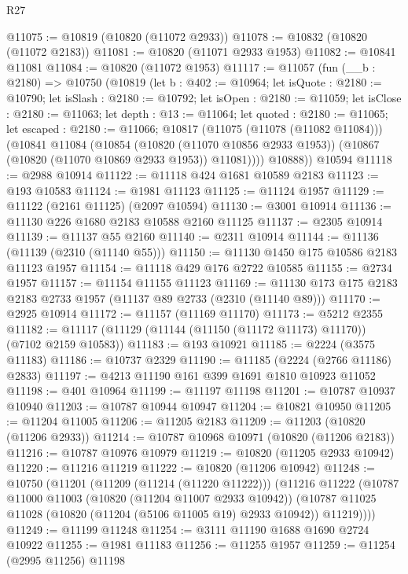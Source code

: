\begin{lexlean}{R27}
\begin{coremodule}
@11075 := @10819 (@10820 (@11072 @2933))
@11078 := @10832 (@10820 (@11072 @2183))
@11081 := @10820 (@11071 @2933 @1953)
@11082 := @10841 @11081
@11084 := @10820 (@11072 @1953)
@11117 := @11057
    (fun (__b : @2180) =>
    @10750
      (@10819
        (let b : @402 := @10964;
        let isQuote : @2180 := @10790;
        let isSlash : @2180 := @10792;
        let isOpen : @2180 := @11059;
        let isClose : @2180 := @11063;
        let depth : @13 := @11064;
        let quoted : @2180 := @11065;
        let escaped : @2180 := @11066;
        @10817
          (@11075 (@11078 (@11082 @11084)))
          (@10841
            @11084
            (@10854
              (@10820 (@11070 @10856 @2933 @1953))
              (@10867 (@10820 (@11070 @10869 @2933 @1953)) @11081))))
        @10888))
    @10594
@11118 := @2988 @10914
@11122 := @11118 @424 @1681 @10589 @2183
@11123 := @193 @10583
@11124 := @1981 @11123
@11125 := @11124 @1957
@11129 := @11122 (@2161 @11125) (@2097 @10594)
@11130 := @3001 @10914
@11136 := @11130 @226 @1680 @2183 @10588 @2160 @11125
@11137 := @2305 @10914
@11139 := @11137 @55 @2160
@11140 := @2311 @10914
@11144 := @11136 (@11139 (@2310 (@11140 @55)))
@11150 := @11130 @1450 @175 @10586 @2183 @11123 @1957
@11154 := @11118 @429 @176 @2722 @10585
@11155 := @2734 @1957
@11157 := @11154 @11155 @11123
@11169 := @11130 @173 @175 @2183 @2183 @2733 @1957 (@11137 @89 @2733 (@2310 (@11140 @89)))
@11170 := @2925 @10914
@11172 := @11157 (@11169 @11170)
@11173 := @5212 @2355
@11182 := @11117 (@11129 (@11144 (@11150 (@11172 @11173) @11170)) (@7102 @2159 @10583))
@11183 := @193 @10921
@11185 := @2224 (@3575 @11183)
@11186 := @10737 @2329
@11190 := @11185 (@2224 (@2766 @11186) @2833)
@11197 := @4213 @11190 @161 @399 @1691 @1810 @10923 @11052
@11198 := @401 @10964
@11199 := @11197 @11198
@11201 := @10787 @10937 @10940
@11203 := @10787 @10944 @10947
@11204 := @10821 @10950
@11205 := @11204 @11005
@11206 := @11205 @2183
@11209 := @11203 (@10820 (@11206 @2933))
@11214 := @10787 @10968 @10971 (@10820 (@11206 @2183))
@11216 := @10787 @10976 @10979
@11219 := @10820 (@11205 @2933 @10942)
@11220 := @11216 @11219
@11222 := @10820 (@11206 @10942)
@11248 := @10750
    (@11201
      (@11209 (@11214 (@11220 @11222)))
      (@11216
        @11222
        (@10787
          @11000
          @11003
          (@10820 (@11204 @11007 @2933 @10942))
          (@10787 @11025 @11028 (@10820 (@11204 (@5106 @11005 @19) @2933 @10942)) @11219))))
@11249 := @11199 @11248
@11254 := @3111 @11190 @1688 @1690 @2724 @10922
@11255 := @1981 @11183
@11256 := @11255 @1957
@11259 := @11254 (@2995 @11256) @11198

\end{coremodule}
\end{lexlean}
